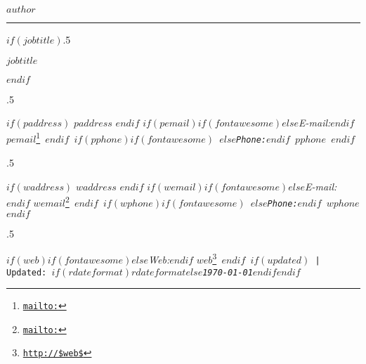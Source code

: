 \documentclass[$if(fontsize)$$fontsize$,$endif$$if(lang)$$babel-lang$,$endif$$if(papersize)$$papersize$paper,$endif$$for(classoption)$$classoption$$sep$,$endfor$]{$documentclass$}
\renewcommand{\href}[2]{#2\footnote{\url{#1}}}
\begin{document}
\thispagestyle{firstpage} %

\centerline{\huge \sffamily \bfseries $author$}

\vspace{2 mm}

\hrule

\vspace{2 mm}

$if(jobtitle)$\moveleft.5\hoffset\centerline{$jobtitle$}$endif$

\moveleft.5\hoffset\centerline{$if(paddress)$ $paddress$ $endif$ $if(pemail)$$if(fontawesome)$\faEnvelopeO \hspace{1 mm}$else$\emph{E-mail:}$endif$ \href{mailto:}{\tt $pemail$} \hspace{1 mm}$endif$ $if(pphone)$$if(fontawesome)$ \faPhone \hspace{1 mm}$else$\emph{Phone:}$endif$ $pphone$ $endif$} 

\moveleft.5\hoffset\centerline{$if(waddress)$ $waddress$ $endif$ $if(wemail)$$if(fontawesome)$\faEnvelopeO \hspace{1 mm}$else$\emph{E-mail:}$endif$ \href{mailto:}{\tt $wemail$} \hspace{1 mm}$endif$ $if(wphone)$$if(fontawesome)$ \faPhone \hspace{1 mm}$else$\emph{Phone:}$endif$ $wphone$ $endif$} 

\moveleft.5\hoffset\centerline{ $if(web)$$if(fontawesome)$\faGlobe \hspace{1 mm}$else$\emph{Web:}$endif$ \href{http://$web$}{\tt $web$} \hspace{1 mm} $endif$ $if(updated)$ | Updated: $if(rdateformat)$\emph{$rdateformat$}$else$\emph{\apstylekinda\today}$endif$$endif$}

\end{document}
